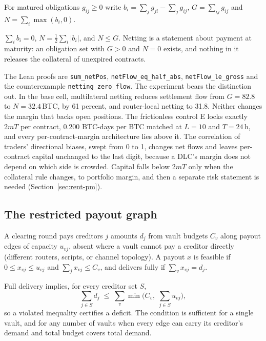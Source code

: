 For matured obligations $g_{ij}\ge0$ write $b_i=\sum_j g_{ji}-\sum_j g_{ij}$, $G=\sum_{ij}g_{ij}$ and $N=\sum_i\max(b_i,0)$.

\begin{proposition}
\label{prop:netting}
$\sum_i b_i=0$, $N=\tfrac12\sum_i|b_i|$, and $N\le G$. Netting is a statement about payment at maturity: an obligation set with $G>0$ and $N=0$ exists, and nothing in it releases the collateral of unexpired contracts.
\end{proposition}

The Lean proofs are \texttt{sum\_\allowbreak{}netPos}, \texttt{netFlow\_\allowbreak{}eq\_\allowbreak{}half\_\allowbreak{}abs}, \texttt{netFlow\_\allowbreak{}le\_\allowbreak{}gross} and the counterexample \texttt{netting\_\allowbreak{}zero\_\allowbreak{}flow}. The experiment bears the distinction out. In the base cell, multilateral netting reduces settlement flow from $G=82.8$ to $N=32.4$\,BTC, by 61 percent, and router-local netting to 31.8. Neither changes the margin that backs open positions. The frictionless control E locks exactly $2mT$ per contract, $0.200$ BTC-days per BTC matched at $L=10$ and $T=24$\,h, and every per-contract-margin architecture lies above it. The correlation of traders' directional biases, swept from 0 to 1, changes net flows and leaves per-contract capital unchanged to the last digit, because a DLC's margin does not depend on which side is crowded. Capital falls below $2mT$ only when the collateral rule changes, to portfolio margin, and then a separate risk statement is needed (Section~\ref{sec:rent-pm}).

\subsection{The restricted payout graph}
\label{sec:rent-cut}

A clearing round pays creditors $j$ amounts $d_j$ from vault budgets $C_v$ along payout edges of capacity $u_{vj}$, absent where a vault cannot pay a creditor directly (different routers, scripts, or channel topology). A payout $x$ is feasible if $0\le x_{vj}\le u_{vj}$ and $\sum_j x_{vj}\le C_v$, and delivers fully if $\sum_v x_{vj}=d_j$.

\begin{proposition}
\label{prop:payoutcut}
Full delivery implies, for every creditor set $S$,
\[
\sum_{j\in S}d_j\;\le\;\sum_v\min\Big(C_v,\;\sum_{j\in S}u_{vj}\Big),
\]
so a violated inequality certifies a deficit. The condition is sufficient for a single vault, and for any number of vaults when every edge can carry its creditor's demand and total budget covers total demand.
\end{proposition}

